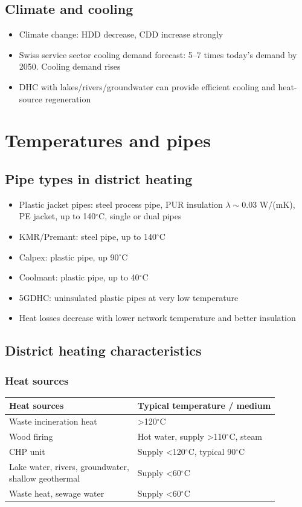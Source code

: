 \documentclass[9pt, landscape, a4paper]{article}
\newcommand{\cel}{\ensuremath{^\circ}C}
\begin{document}
\begin{multicols*}{3}
\subsection{Climate and cooling}
\begin{itemize}
  \item Climate change: HDD decrease, CDD increase strongly
  \item Swiss service sector cooling demand forecast: 5--7 times today's demand by 2050. Cooling demand rises
  \item DHC with lakes/rivers/groundwater can provide efficient cooling and heat-source regeneration
\end{itemize}

\newcolumn
\section{Temperatures and pipes}
\subsection{Pipe types in district heating}
\begin{itemize}
  \item Plastic jacket pipes: steel process pipe, PUR insulation $\lambda\sim0.03$ W/(mK), PE jacket, up to 140\cel, single or dual pipes
  \item KMR/Premant: steel pipe, up to 140\cel
  \item Calpex: plastic pipe, up 90\cel
  \item Coolmant: plastic pipe, up to 40\cel
  \item 5GDHC: uninsulated plastic pipes at very low temperature
  \item Heat losses decrease with lower network temperature and better insulation
\end{itemize}

\subsection{District heating characteristics}
\subsubsection{Heat sources}
{\footnotesize
  \begin{tabularx}{\columnwidth}{@{}XX@{}}
  \toprule
  \textbf{Heat sources} & \textbf{Typical temperature / medium}\\
  \midrule
  Waste incineration heat & >120\cel\\
  \hline Wood firing & Hot water, supply >110\cel, steam\\
  \hline CHP unit & Supply <120\cel, typical 90\cel\\
  \hline \makecell[l]{Lake water, rivers, groundwater,\\shallow geothermal} & Supply <60\cel\\
  \hline Waste heat, sewage water & Supply <60\cel\\
  \bottomrule
\end{tabularx}}


\end{multicols*}
\end{document}
